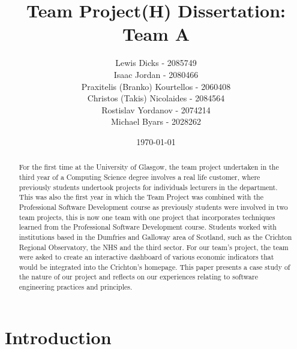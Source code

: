 \documentclass{l3proj}
\begin{document}
\title{Team Project(H) Dissertation: Team A}

\author{Lewis Dicks - 2085749 \\
        Isaac Jordan - 2080466 \\
        Praxitelis (Branko) Kourtellos - 2060408 \\
        Christos (Takis) Nicolaides - 2084564  \\
        Rostislav Yordanov - 2074214 \\
        Michael Byars - 2028262}

\date{\today}

\maketitle

\begin{abstract}

For the first time at the University of Glasgow, the team project undertaken in the third year of a Computing Science
degree involves a real life customer, where previously students undertook projects for individuals lecturers in the
department. This was also the first year in which the Team Project was combined with the Professional Software
Development course as previously students were involved in two team projects, this is now one team with one project that
incorporates techniques learned from the Professional Software Development course. Students worked with institutions
based in the Dumfries and Galloway area of Scotland, such as the Crichton Regional Observatory, the NHS and the third
sector. For our team's project, the team were asked to create an interactive dashboard of various economic indicators that
would be integrated into the Crichton's homepage. This paper presents a case study of the nature of our project and
reflects on our experiences relating to software engineering practices and principles.

\end{abstract}

\educationalconsent

\newpage

\section{Introduction}
\label{sec:introduction}
\end{document}
